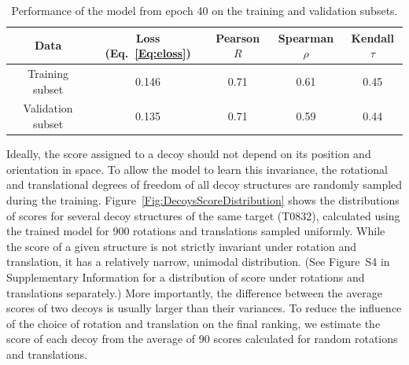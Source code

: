 \documentclass{bioinfo}
\begin{document}
\begin{table}[!t]
  \centering
  \caption {Performance of the model from epoch 40 on the training and
    validation subsets.}
\begin{tabular}{ c c c c c }
    Data & Loss (Eq.~\ref{Eq:eloss}) & Pearson $R$ & Spearman $\rho$ & Kendall $\tau$ \\
    \hline
    Training subset     &0.146 &0.71 &0.61 &0.45 \\
    Validation subset   &0.135 &0.71 &0.59 &0.44 \\ \hline
\end{tabular}
\label{Tbl:TrainingResults}
\end{table}
Ideally, the score assigned to a decoy should not depend on its
position and orientation in space. To allow the model to learn this
invariance, the rotational and translational degrees of freedom of all
decoy structures are randomly sampled during the training.
Figure~\ref{Fig:DecoysScoreDistribution} shows the distributions of
scores for several decoy structures of the same target (T0832),
calculated using the trained model for 900 rotations and translations
sampled uniformly.  While the score of a given structure is not
strictly invariant under rotation and translation, it has a relatively
narrow, unimodal distribution.  (See Figure~S4 in Supplementary
Information for a distribution of score under rotations and
translations separately.)  More importantly, the difference between
the average scores of two decoys is usually larger than their
variances.
To reduce the influence of the choice of rotation and translation on
the final ranking, we estimate the score of each decoy from the
average of 90 scores calculated for random rotations and translations.

\end{document}
